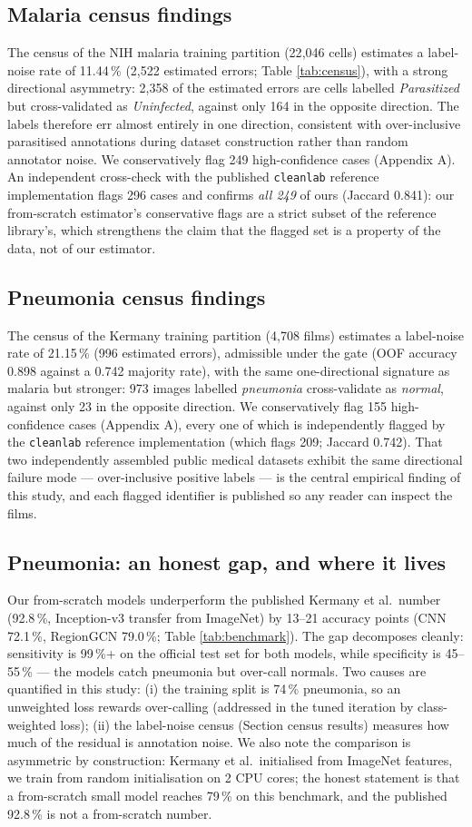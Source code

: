 \subsection{Malaria census findings}
The census of the NIH malaria training partition (22{,}046 cells) estimates
a label-noise rate of 11.44\,\% (2{,}522 estimated errors; Table
\ref{tab:census}), with a strong directional asymmetry: 2{,}358 of the
estimated errors are cells labelled \emph{Parasitized} but cross-validated
as \emph{Uninfected}, against only 164 in the opposite direction. The
labels therefore err almost entirely in one direction, consistent with
over-inclusive parasitised annotations during dataset construction rather
than random annotator noise. We conservatively flag 249 high-confidence
cases (Appendix A). An independent cross-check with the published
\texttt{cleanlab} reference implementation flags 296 cases and confirms
\emph{all 249} of ours (Jaccard 0.841): our from-scratch estimator's
conservative flags are a strict subset of the reference library's, which
strengthens the claim that the flagged set is a property of the data, not
of our estimator.
\subsection{Pneumonia census findings}
The census of the Kermany training partition (4{,}708 films) estimates a
label-noise rate of 21.15\,\% (996 estimated errors), admissible under
the gate (OOF accuracy 0.898 against a 0.742 majority rate), with the
same one-directional signature as malaria but stronger: 973 images
labelled \emph{pneumonia} cross-validate as \emph{normal}, against only
23 in the opposite direction. We conservatively flag 155 high-confidence
cases (Appendix A), every one of which is independently flagged by the
\texttt{cleanlab} reference implementation (which flags 209; Jaccard
0.742). That two independently assembled public medical datasets exhibit
the same directional failure mode --- over-inclusive positive labels ---
is the central empirical finding of this study, and each flagged
identifier is published so any reader can inspect the films.
\subsection{Pneumonia: an honest gap, and where it lives}
Our from-scratch models underperform the published Kermany et al.\ number
(92.8\,\%, Inception-v3 transfer from ImageNet) by 13--21 accuracy points
(CNN 72.1\,\%, RegionGCN 79.0\,\%; Table \ref{tab:benchmark}). The gap
decomposes cleanly: sensitivity is 99\,\%+ on the official test set for
both models, while specificity is 45--55\,\% --- the models catch
pneumonia but over-call normals. Two causes are quantified in this study:
(i) the training split is 74\,\% pneumonia, so an unweighted loss rewards
over-calling (addressed in the tuned iteration by class-weighted loss);
(ii) the label-noise census (Section census results) measures how much of
the residual is annotation noise. We also note the comparison is
asymmetric by construction: Kermany et al.\ initialised from ImageNet
features, we train from random initialisation on 2 CPU cores; the honest
statement is that a from-scratch small model reaches 79\,\% on this
benchmark, and the published 92.8\,\% is not a from-scratch number.
